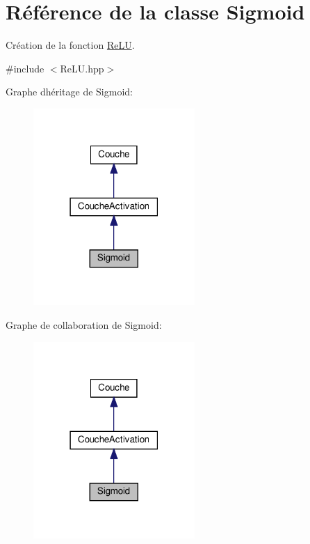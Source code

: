 \hypertarget{class_sigmoid}{}\section{Référence de la classe Sigmoid}
\label{class_sigmoid}


Création de la fonction \hyperlink{class_re_l_u}{Re\+LU}.  




{\ttfamily \#include $<$Re\+L\+U.\+hpp$>$}



Graphe d\textquotesingle{}héritage de Sigmoid\+:\nopagebreak
\begin{figure}[H]
\begin{center}
\leavevmode
\includegraphics[width=174pt]{class_sigmoid__inherit__graph}
\end{center}
\end{figure}


Graphe de collaboration de Sigmoid\+:\nopagebreak
\begin{figure}[H]
\begin{center}
\leavevmode
\includegraphics[width=174pt]{class_sigmoid__coll__graph}
\end{center}
\end{figure}
